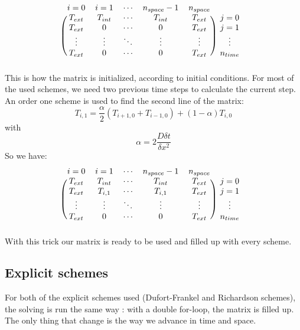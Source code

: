 \documentclass{article}
\begin{document}
        \[
            \begin{blockarray}{cccccc}
            i=0 & i=1 & \cdots & n_{space}-1 & n_{space} \\
            \begin{block}{(ccccc)c}
              T_{ext} & T_{int} & \cdots & T_{int} & T_{ext} & j=0 \\
              T_{ext} & 0 & \cdots & 0 & T_{ext} & j=1 \\
              \vdots & \vdots & \ddots & \vdots & \vdots & \vdots \\
              T_{ext} & 0 & \cdots & 0 & T_{ext} & n_{time} \\
            \end{block}
            \end{blockarray}
        \]
        This is how the matrix is initialized, according to initial conditions.
        For most of the used schemes, we need two previous time steps to calculate the current step.
        An order one scheme is used to find the second line of the matrix:
        \begin{equation}
            T_{i,1} = \frac{\alpha}{2} (T_{i+1,0} + T_{i-1,0}) + (1-\alpha)T_{i,0}
        \end{equation}
        with $$\alpha = 2\frac{D\delta t}{\delta x^{2}}$$
        So we have:
        \[
            \begin{blockarray}{cccccc}
            i = 0 & i = 1 & \cdots & n_{space}-1 & n_{space} \\
            \begin{block}{(ccccc)c}
              T_{ext} & T_{int} & \cdots & T_{int} & T_{ext} & j=0 \\
              T_{ext} & T_{i,1} & \cdots & T_{i,1} & T_{ext} & j=1 \\
              \vdots & \vdots & \ddots & \vdots & \vdots & \vdots \\
              T_{ext} & 0 & \cdots & 0 & T_{ext} & n_{time} \\
            \end{block}
            \end{blockarray}
        \]
        With this trick our matrix is ready to be used and filled up with every scheme.

        \subsection{Explicit schemes}
            For both of the explicit schemes used (Dufort-Frankel and Richardson schemes), the solving
            is run the same way : with a double for-loop, the matrix is filled up. The only thing that change
            is the way we advance in time and space.
\end{document}
